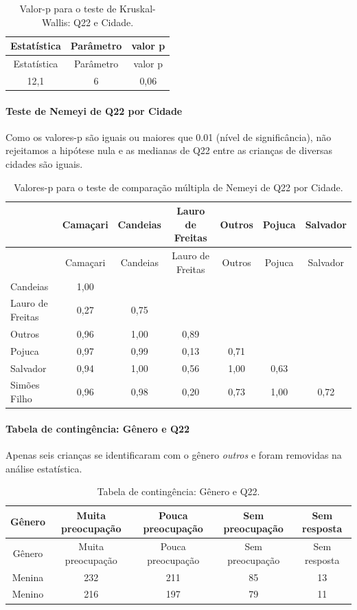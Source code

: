 \documentclass[]{article}
\let\oldparagraph\paragraph
\renewcommand{\paragraph}[1]{\oldparagraph{#1}\mbox{}}
\begin{document}
\begin{longtable}[]{@{}ccc@{}}
\caption{\label{tab:unnamed-chunk-492}Valor-p para o teste de Kruskal-Wallis: Q22 e Cidade.}\tabularnewline
\toprule
Estatística & Parâmetro & valor p\tabularnewline
\midrule
\endfirsthead
\toprule
Estatística & Parâmetro & valor p\tabularnewline
\midrule
\endhead
12,1 & 6 & 0,06\tabularnewline
\bottomrule
\end{longtable}

\hypertarget{teste-de-nemeyi-de-q22-por-cidade}{%
\paragraph{Teste de Nemeyi de Q22 por Cidade}\label{teste-de-nemeyi-de-q22-por-cidade}}

Como os valores-p são iguais ou maiores que 0.01 (nível de significância), não rejeitamos a hipótese nula e as medianas de Q22 entre as crianças de diversas cidades são iguais.

\begin{longtable}[]{@{}lcccccc@{}}
\caption{\label{tab:unnamed-chunk-494}Valores-p para o teste de comparação múltipla de Nemeyi de Q22 por Cidade.}\tabularnewline
\toprule
& Camaçari & Candeias & Lauro de Freitas & Outros & Pojuca & Salvador\tabularnewline
\midrule
\endfirsthead
\toprule
& Camaçari & Candeias & Lauro de Freitas & Outros & Pojuca & Salvador\tabularnewline
\midrule
\endhead
Candeias & 1,00 & & & & &\tabularnewline
Lauro de Freitas & 0,27 & 0,75 & & & &\tabularnewline
Outros & 0,96 & 1,00 & 0,89 & & &\tabularnewline
Pojuca & 0,97 & 0,99 & 0,13 & 0,71 & &\tabularnewline
Salvador & 0,94 & 1,00 & 0,56 & 1,00 & 0,63 &\tabularnewline
Simões Filho & 0,96 & 0,98 & 0,20 & 0,73 & 1,00 & 0,72\tabularnewline
\bottomrule
\end{longtable}

\cleardoublepage

\hypertarget{tabela-de-continguxeancia-guxeanero-e-q22}{%
\paragraph{Tabela de contingência: Gênero e Q22}\label{tabela-de-continguxeancia-guxeanero-e-q22}}

Apenas seis crianças se identificaram com o gênero \emph{outros} e foram removidas na análise estatística.

\begin{longtable}[]{@{}ccccc@{}}
\caption{\label{tab:unnamed-chunk-495}Tabela de contingência: Gênero e Q22.}\tabularnewline
\toprule
Gênero & Muita preocupação & Pouca preocupação & Sem preocupação & Sem resposta\tabularnewline
\midrule
\endfirsthead
\toprule
Gênero & Muita preocupação & Pouca preocupação & Sem preocupação & Sem resposta\tabularnewline
\midrule
\endhead
Menina & 232 & 211 & 85 & 13\tabularnewline
Menino & 216 & 197 & 79 & 11\tabularnewline
\bottomrule
\end{longtable}
\end{document}
